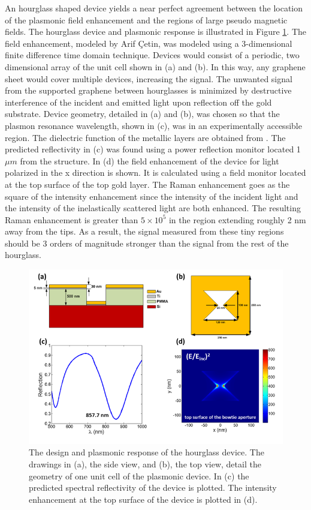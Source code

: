An hourglass shaped device yields a near perfect agreement between the location of the plasmonic field enhancement and the regions of large pseudo magnetic fields.
The hourglass device and plasmonic response is illustrated in Figure \ref{fig:PVP:hourglass_Plas}.
The field enhancement, modeled by Arif \c{C}etin, was modeled using a 3-dimensional finite difference time domain technique.
Devices would consist of a periodic, two dimensional array of the unit cell shown in (a) and (b).
In this way, any graphene sheet would cover multiple devices, increasing the signal.
The unwanted signal from the supported graphene between hourglasses is minimized by destructive interference of the incident and emitted light upon reflection off the gold substrate.
Device geometry, detailed in (a) and (b), was chosen so that the plasmon resonance wavelength, shown in (c), was in an experimentally accessible region.
The dielectric function of the metallic layers are obtained from \cite{Palik1985}.
The predicted reflectivity in (c) was found using a power reflection monitor located 1 $\mu m$ from the structure.
In (d) the field enhancement of the device for light polarized in the x direction is shown.
It is calculated using a field monitor located at the top surface of the top gold layer.
The Raman enhancement goes as the square of the intensity enhancement since the intensity of the incident light and the intensity of the inelastically scattered light are both enhanced.
The resulting Raman enhancement is greater than $5 \times 10^5$ in the region extending roughly 2 nm away from the tips.
As a result, the signal measured from these tiny regions should be 3 orders of magnitude stronger than the signal from the rest of the hourglass.

\begin{figure}
  \begin{center}
  \includegraphics[scale=.75]{Figs_PVP/HourGlass_Plasmonics.png}
  \end{center}
  \caption[The design and plasmonic response of the hourglass device]{\label{fig:PVP:hourglass_Plas} The design and plasmonic response of the hourglass device.  The drawings in (a), the side view, and (b), the top view, detail the geometry of one unit cell of the plasmonic device. In (c) the predicted spectral reflectivity of the device is plotted.  The intensity enhancement at the top surface of the device is plotted in (d).}
\end{figure}

